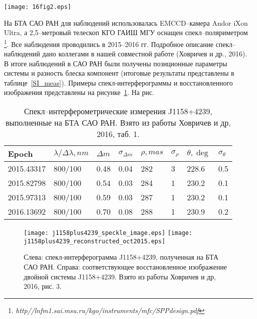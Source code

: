 \begin{figure*}
\centering
\texttt{[image: 16fig2.eps]}
\caption{Движение фотоцентра системы J1158+4239 по данным фотографических и цифровых обзоров неба (1955 - POSS1, 1984 - GSC1, 1990 и 1991 - POSS2, 1996 - GSC2, 2003 - SDSS, 2012 - пулковские наблюдения). Линия характеризует среднее движение фотоцентра.  Взято из работы , рис. 2.}
\label{fig:J1158+4258_motion}
\end{figure*}
На БТА САО РАН для наблюдений использовалась  EMCCD--камера Andor iXon Ultra, а 2,5--метровый телескоп КГО ГАИШ МГУ оснащен спекл--поляриметром \cite{SPPdesign} \footnote{\textit{http//lnfm1.sai.msu.ru/kgo/instruments/mfc/SPPdesign.pdf}}. Все наблюдения проводились в 2015--2016 гг.  Подробное описание спекл--наблюдений дано коллегами в нашей совместной работе (Ховричев и др., 2016). В итоге наблюдений в САО РАН были получены позиционные параметры системы и разность блеска компонент (итоговые результаты представлены в таблице~\ref{SI_meas}).  Примеры спекл-интерферограммы и восстановленного изображения представлены на рисунке~\ref{fig:sao_spekle_image}. На рис. 

\begin{table}[p]
\centering
\caption{Спекл--интерферометрические измерения J1158+4239, выполненные на БТА САО РАН. Взято из работы Ховричев и др, 2016, таб. 1.}
\label{tab:SI_meas}
\bigskip
\begin{tabularx}{\textwidth}{l|l|ll|ll|ll}
Epoch      & $\lambda /\Delta \lambda, nm$ & $\Delta m$ & $\sigma _{\Delta m}$ & $\rho, mas$ & $\sigma _\rho$ & $\theta, \deg $& $\sigma_\theta$ \\
\hline
2015.43317 & 800/100 & 0.48 & 0.04 & 282 & 3  & 228.6 & 0.5               \\
2015.82798 & 800/100 & 0.54 & 0.03 & 284 & 1  & 230.2 & 0.1               \\
2015.97313 & 800/100 & 0.59 & 0.03 & 287 & 1  & 230.2 & 0.1               \\
2016.13692 & 800/100 & 0.70 & 0.08 & 288 & 1  & 230.9 & 0.2               \\
\hline
\end{tabularx}
\end{table}

\begin{figure}
\centering
\texttt{[image: j1158plus4239\_speckle\_image.eps]}
\texttt{[image: j1158plus4239\_reconstructed\_oct2015.eps]}
\caption{Слева: спекл-интерферограмма J1158+4239, полученная на БТА САО РАН. Справа: соответствующее восстановленное изображение двойной системы J1158+4239. Взято из работы Ховричев и др, 2016, рис. 3.}
\label{fig:sao_spekle_image}
\end{figure}

